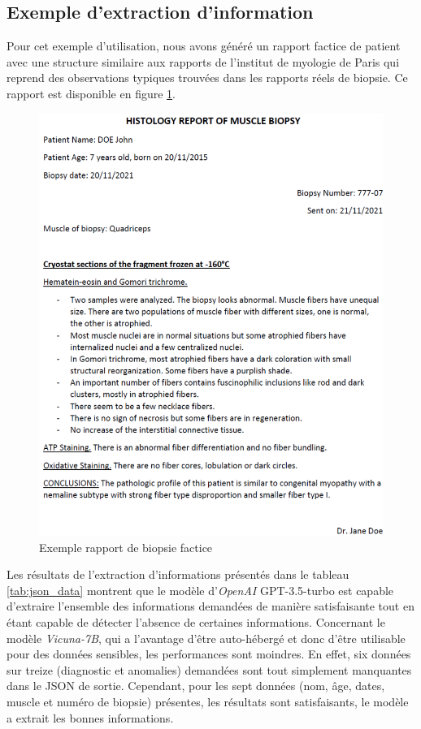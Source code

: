 \subsection{Exemple d'extraction d'information}
Pour cet exemple d'utilisation, nous avons généré un rapport factice de patient avec une structure similaire aux rapports de l'institut de myologie de Paris qui reprend des observations typiques trouvées dans les rapports réels de biopsie. Ce rapport est disponible en figure \ref{fig:factice_report}. 
\begin{figure}[!ht]
 \centering
 \includegraphics[width=1\textwidth]{figures/pdf_biopsie.png}
 \caption[Rapport de biopsie factice]{Exemple rapport de biopsie factice}
 \label{fig:factice_report}
\end{figure}

Les résultats de l'extraction d'informations présentés dans le tableau \ref{tab:json_data} montrent que le modèle d'\textit{OpenAI} GPT-3.5-turbo est capable d'extraire l'ensemble des informations demandées de manière satisfaisante tout en étant capable de détecter l'absence de certaines informations. Concernant le modèle \textit{Vicuna-7B}, qui a l'avantage d'être auto-hébergé et donc d'être utilisable pour des données sensibles, les performances sont moindres. En effet, six données sur treize (diagnostic et anomalies) demandées sont tout simplement manquantes dans le JSON de sortie. Cependant, pour les sept données (nom, âge, dates, muscle et numéro de biopsie) présentes, les résultats sont satisfaisants, le modèle a extrait les bonnes informations.

